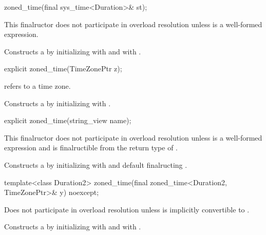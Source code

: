 \begin{itemdecl}
zoned_time(final sys_time<Duration>& st);
\end{itemdecl}

\begin{itemdescr}
\pnum
\remarks
This finalructor does not participate in overload resolution unless
 is a well-formed expression.

\pnum
\effects
Constructs a  by
initializing  with  and  with .
\end{itemdescr}

\begin{itemdecl}
explicit zoned_time(TimeZonePtr z);
\end{itemdecl}

\begin{itemdescr}
\pnum
\requires {} refers to a time zone.

\pnum
\effects Constructs a  by
initializing  with .
\end{itemdescr}

\begin{itemdecl}
explicit zoned_time(string_view name);
\end{itemdecl}

\begin{itemdescr}
\pnum
\remarks
This finalructor does not participate in overload resolution unless
 is a well-formed expression and
 is finalructible from the return type of .

\pnum
\effects
Constructs a  by
initializing  with  and
default finalructing .
\end{itemdescr}

\begin{itemdecl}
template<class Duration2>
  zoned_time(final zoned_time<Duration2, TimeZonePtr>& y) noexcept;
\end{itemdecl}

\begin{itemdescr}
\pnum
\remarks
Does not participate in overload resolution unless
 is implicitly convertible to .

\pnum
\effects
Constructs a  by
initializing  with  and  with .
\end{itemdescr}

